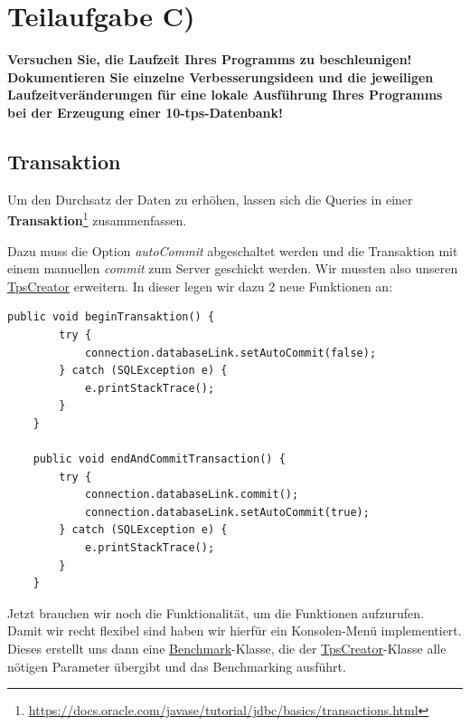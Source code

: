 \section{Teilaufgabe C)}
\textbf{Versuchen Sie, die Laufzeit Ihres Programms zu beschleunigen! Dokumentieren Sie
einzelne Verbesserungsideen und die jeweiligen Laufzeitveränderungen für eine lokale
Ausführung Ihres Programms bei der Erzeugung einer 10-tps-Datenbank!}

\subsection{Transaktion}
Um den Durchsatz der Daten zu erhöhen, lassen sich die Queries in einer
\textbf{Transaktion}\footnote{\url{https://docs.oracle.com/javase/tutorial/jdbc/basics/transactions.html}} zusammenfassen.  

Dazu muss die Option \textit{autoCommit} abgeschaltet werden und die Transaktion
mit einem manuellen \textit{commit} zum Server geschickt werden. Wir mussten
also unseren \hyperref[lst:tpsv2]{TpsCreator} erweitern. In
dieser legen wir dazu 2 neue Funktionen an:

\begin{lstlisting}[caption={Erweiterung der TpsCreator-Klasse}]
	public void beginTransaktion() {
		try {
			connection.databaseLink.setAutoCommit(false);
		} catch (SQLException e) {
			e.printStackTrace();
		}
	}
	
	public void endAndCommitTransaction() {
		try {
			connection.databaseLink.commit();
			connection.databaseLink.setAutoCommit(true);
		} catch (SQLException e) {
			e.printStackTrace();
		}
	}
\end{lstlisting}

Jetzt brauchen wir noch die Funktionalität, um die Funktionen aufzurufen. Damit
wir recht flexibel sind haben wir hierfür ein Konsolen-Menü implementiert.
Dieses erstellt uns dann eine  \hyperref[lst:bmv2]{Benchmark}-Klasse, die der
\hyperref[lst:tpsv2]{TpsCreator}-Klasse alle nötigen Parameter übergibt und das Benchmarking ausführt.\\


